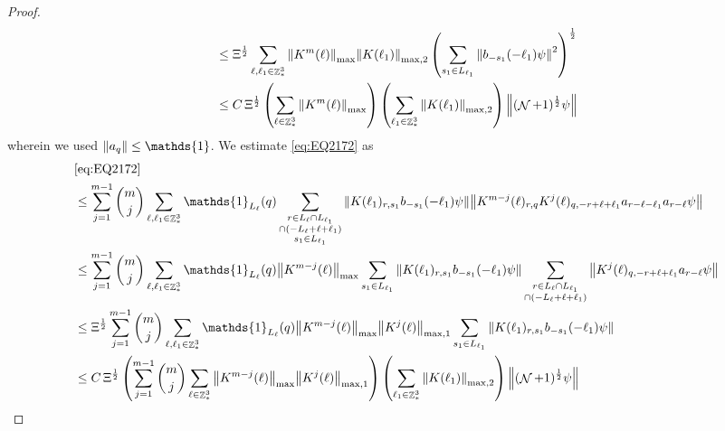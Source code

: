 \documentclass[sn-mathphys, Numbered ,a4paper]{sn-jnl}%
\DeclareMathOperator{\Z}{\mathbb{Z}}
\DeclareMathOperator{\NN}{\mathcal{N}}
\newcommand{\half}{\frac{1}{2}}
\theoremstyle{plain}
\theoremstyle{definition}
\theoremstyle{remark}
\theoremstyle{plain}
\theoremstyle{definition}
\theoremstyle{remark}
\begin{document}
\begin{proof}
\begin{align}
	&\leq \Xi^\half \sum\limits_{\ell, \ell_1\in \Z^3_*}  \norm{K^m(\ell)}_{\mathrm{max}} \norm{K(\ell_1)}_{\mathrm{max,2}} \left(\sum\limits_{s_1 \in L_{\ell_1}} \norm{ b_{-s_1}(-\ell_1) \psi}^2\right)^\half\nonumber\\
	&\leq C\, \Xi^\half \left(\sum\limits_{\ell \in \Z^3_*} \norm{K^m(\ell)}_{\mathrm{max}}\right)\left( \sum\limits_{\ell_1\in \Z^3_*} \norm{ K(\ell_1)}_{\mathrm{max,2}} \right) \norm{(\NN+1)^\half\psi}\label{eq:estEQ2171}
\end{align}
wherein we used $\norm{a_q} \leq \mathds{1}$.
We estimate \eqref{eq:EQ2172} as
\begin{align}
	&\eqref{eq:EQ2172}\nonumber\\
	&\leq\sum\limits_{j=1}^{m-1} {{m}\choose j} \sum\limits_{\ell, \ell_1\in \Z^3_*}\mathds{1}_{L_{\ell}}(q) \sum\limits_{\substack{r\in L_{\ell} \cap L_{\ell_1} \\ \cap (-L_{\ell}+\ell+\ell_1)\\s_1\in L_{\ell_1}}}  \norm{K(\ell_1)_{r,s_1} b_{-s_1}(-\ell_1) \psi}\norm{ K^{m-j}(\ell)_{r,q} K^j(\ell)_{q,-r+\ell+\ell_1} a_{r-\ell-\ell_1} a_{r-\ell} \psi }\nonumber\\
	&\leq\sum\limits_{j=1}^{m-1} {{m}\choose j} \sum\limits_{\ell, \ell_1\in \Z^3_*}\mathds{1}_{L_{\ell}}(q) \norm{K^{m-j}(\ell)}_{\mathrm{max}} \sum\limits_{s_1\in L_{\ell_1}} \norm{K(\ell_1)_{r,s_1} b_{-s_1}(-\ell_1) \psi} \sum\limits_{\substack{r\in L_{\ell} \cap L_{\ell_1} \\ \cap (-L_{\ell}+\ell+\ell_1)}}  \norm{  K^j(\ell)_{q,-r+\ell+\ell_1} a_{r-\ell} \psi }\nonumber\\
	&\leq \Xi^\half \sum\limits_{j=1}^{m-1} {{m}\choose j} \sum\limits_{\ell, \ell_1\in \Z^3_*}\mathds{1}_{L_{\ell}}(q)  \norm{K^{m-j}(\ell)}_{\mathrm{max}} \norm{K^{j}(\ell)}_{\mathrm{max,1}}  \sum\limits_{s_1\in L_{\ell_1}} \norm{K(\ell_1)_{r,s_1} b_{-s_1}(-\ell_1) \psi} \nonumber\\
	&\leq  C\,\Xi^\half \left( \sum\limits_{j=1}^{m-1} {{m}\choose j} \sum\limits_{\ell \in \Z^3_*} \norm{K^{m-j}(\ell)}_{\mathrm{max}} \norm{ K^{j}(\ell)}_{\mathrm{max},1}\right) \left( \sum\limits_{ \ell_1\in \Z^3_*}\norm{ K(\ell_1) }_{\mathrm{max,2}} \right) \norm{ (\NN+1)^\half \psi }\label{eq:estEQ2172}
\end{align}


\end{proof}
\end{document}
